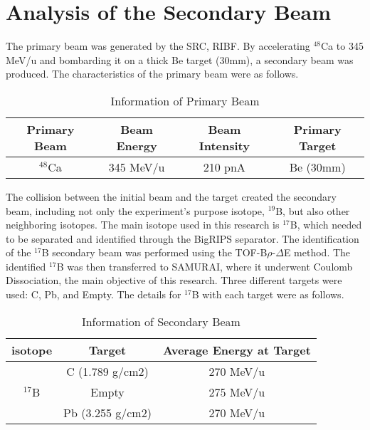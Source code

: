 \section{Analysis of the Secondary Beam}
The primary beam was generated by the SRC, RIBF. By accelerating ${}^{48}$Ca to 345 MeV/u and bombarding it on a thick Be target (30mm), a secondary beam was produced. The characteristics of the primary beam were as follows.
    \begin{table}[ht]
        \centering 
            \begin{tabular}[ht]{c|c|c|c}
                \hline
                Primary Beam & Beam Energy & Beam Intensity & Primary Target  \\
                \hline
                ${}^{48}$Ca & 345 MeV/u & 210 pnA & Be (30mm)\\
                \hline    
            \end{tabular}
        \caption[Short]{Information of Primary Beam}
    \end{table}
\indent The collision between the initial beam and the target created the secondary beam, including not only the experiment's purpose isotope, ${}^{19}$B, but also other neighboring isotopes. The main isotope used in this research is ${}^{17}$B, which needed to be separated and identified through the BigRIPS separator. The identification of the ${}^{17}$B secondary beam was performed using the TOF-B$\rho$-$\Delta$E method. The identified ${}^{17}$B was then transferred to SAMURAI, where it underwent Coulomb Dissociation, the main objective of this research. Three different targets were used: C, Pb, and Empty. The details for ${}^{17}$B with each target were as follows.
    \begin{table}[ht]
        \centering
        \begin{tabular}[ht]{c|c|c}
            \hline
            isotope & Target & Average Energy at Target \\
            \hline
            \hline
            & C (1.789 g/cm2)  & 270 MeV/u\\
            ${}^{17}$B & Empty  & 275 MeV/u\\
            & Pb (3.255 g/cm2) & 270 MeV/u\\
            \hline    
        \end{tabular}
        \caption[short]{Information of Secondary Beam}
    \end{table}

